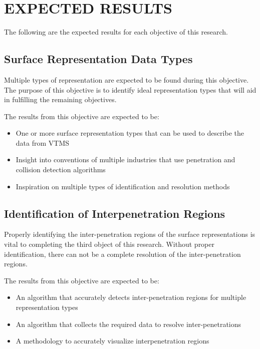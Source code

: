 %
%
%
%



\chapter{EXPECTED RESULTS}
The following are the expected results for each objective of this research.
\section{Surface Representation Data Types}

Multiple types of representation are expected to be found during this objective. The purpose of this objective is to identify ideal representation types that will aid in fulfilling the remaining objectives.

The results from this objective are expected to be:

\begin{itemize}
	\item One or more surface representation types that can be used to describe the data from VTMS
	\item Insight into conventions of multiple industries that use penetration and collision detection algorithms
	\item Inspiration on multiple types of identification and resolution methods
\end{itemize}

\section{Identification of Interpenetration Regions}

Properly identifying the inter-penetration regions of the surface representations is vital to completing the third object of this research. Without proper identification, there can not be a complete resolution of the inter-penetration regions.

The results from this objective are expected to be:
\begin{itemize}
	\item An algorithm that accurately detects inter-penetration regions for multiple representation types
	\item An algorithm that collects the required data to resolve inter-penetrations
	\item A methodology to accurately visualize interpenetration regions
\end{itemize}

